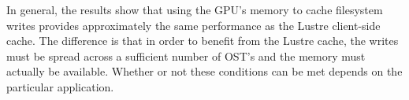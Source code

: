 In general, the results show that using the GPU's memory to cache filesystem writes provides approximately the same performance as the Lustre client-side cache.  The difference is that in order to benefit from the Lustre cache, the writes must be spread across a sufficient number of OST's and the memory must actually be available.  Whether or not these conditions can be met depends on the particular application.  



